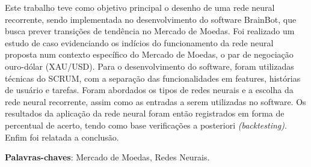 \begin{resumo}
  Este trabalho teve como objetivo principal o desenho de uma rede neural
  recorrente, sendo implementada no desenvolvimento do software BrainBot, que
  busca prever transições de tendência no Mercado de Moedas. Foi realizado um
  estudo de caso evidenciando os indícios do funcionamento da rede neural
  proposta num contexto específico do Mercado de Moedas, o par de negociação
  ouro-dólar (XAU/USD). Para o desenvolvimento do software, foram utilizadas técnicas
  do SCRUM, com a separação das funcionalidades em features, histórias de
  usuário e tarefas. Foram abordados os tipos de redes neurais e a escolha
  da rede neural recorrente, assim como as entradas a serem utilizadas
  no software. Os resultados da aplicação da rede neural foram então registrados
  em forma de percentual de acerto, tendo como base verificações a posteriori
  \textit{(backtesting)}. Enfim foi relatada a conclusão.

 \vspace{\onelineskip}

 \noindent
 \textbf{Palavras-chaves}: Mercado de Moedas, Redes
 Neurais.
\end{resumo}
